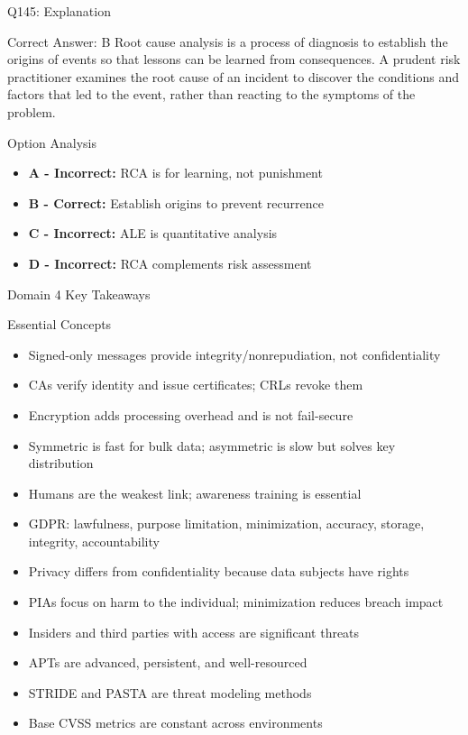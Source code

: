 \documentclass{beamer}
\begin{document}
	\begin{frame}{Q145: Explanation}
		\begin{block}{Correct Answer: B}
			Root cause analysis is a process of diagnosis to establish the origins of events so that lessons can be learned from consequences. A prudent risk practitioner examines the root cause of an incident to discover the conditions and factors that led to the event, rather than reacting to the symptoms of the problem.
		\end{block}
		\begin{block}{Option Analysis}
			\begin{itemize}
				\item \textbf{A - Incorrect:} RCA is for learning, not punishment
				\item \textbf{B - Correct:} Establish origins to prevent recurrence
				\item \textbf{C - Incorrect:} ALE is quantitative analysis
				\item \textbf{D - Incorrect:} RCA complements risk assessment
			\end{itemize}
		\end{block}
	\end{frame}
	
	
	\begin{frame}{Domain 4 Key Takeaways}
		\begin{block}{Essential Concepts}
			\begin{itemize}
				\item Signed-only messages provide integrity/nonrepudiation, not confidentiality
				\item CAs verify identity and issue certificates; CRLs revoke them
				\item Encryption adds processing overhead and is not fail-secure
				\item Symmetric is fast for bulk data; asymmetric is slow but solves key distribution
				\item Humans are the weakest link; awareness training is essential
				\item GDPR: lawfulness, purpose limitation, minimization, accuracy, storage, integrity, accountability
				\item Privacy differs from confidentiality because data subjects have rights
				\item PIAs focus on harm to the individual; minimization reduces breach impact
				\item Insiders and third parties with access are significant threats
				\item APTs are advanced, persistent, and well-resourced
				\item STRIDE and PASTA are threat modeling methods
				\item Base CVSS metrics are constant across environments
			\end{itemize}
		\end{block}
	\end{frame}
	
\end{document}
